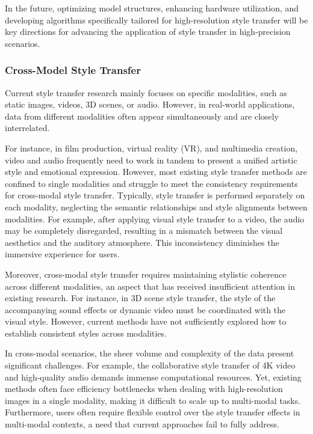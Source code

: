\documentclass[preprint,12pt]{elsarticle}
\begin{document}
In the future, optimizing model structures, enhancing hardware utilization, and developing algorithms specifically tailored for high-resolution style transfer will be key directions for advancing the application of style transfer in high-precision scenarios.

\subsubsection{Cross-Model Style Transfer}

Current style transfer research mainly focuses on specific modalities, such as static images, videos, 3D scenes, or audio. However, in real-world applications, data from different modalities often appear simultaneously and are closely interrelated.

For instance, in film production, virtual reality (VR), and multimedia creation, video and audio frequently need to work in tandem to present a unified artistic style and emotional expression. However, most existing style transfer methods are confined to single modalities and struggle to meet the consistency requirements for cross-modal style transfer. Typically, style transfer is performed separately on each modality, neglecting the semantic relationships and style alignments between modalities. For example, after applying visual style transfer to a video, the audio may be completely disregarded, resulting in a mismatch between the visual aesthetics and the auditory atmosphere. This inconsistency diminishes the immersive experience for users.

Moreover, cross-modal style transfer requires maintaining stylistic coherence across different modalities, an aspect that has received insufficient attention in existing research. For instance, in 3D scene style transfer, the style of the accompanying sound effects or dynamic video must be coordinated with the visual style. However, current methods have not sufficiently explored how to establish consistent styles across modalities.

In cross-modal scenarios, the sheer volume and complexity of the data present significant challenges. For example, the collaborative style transfer of 4K video and high-quality audio demands immense computational resources. Yet, existing methods often face efficiency bottlenecks when dealing with high-resolution images in a single modality, making it difficult to scale up to multi-modal tasks. Furthermore, users often require flexible control over the style transfer effects in multi-modal contexts, a need that current approaches fail to fully address.
\end{document}
